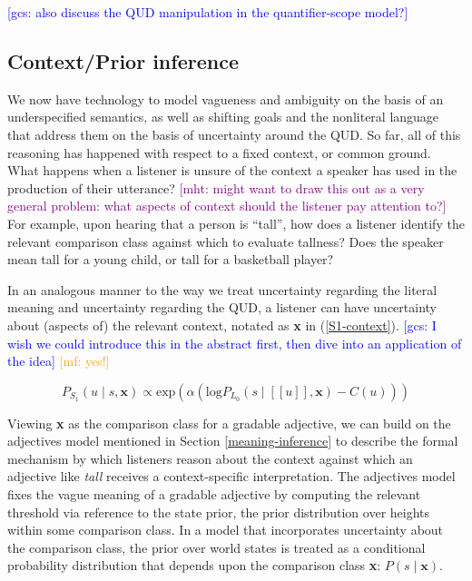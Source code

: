 \documentclass{sp}
\newcommand{\gcs}[1]{\textcolor{blue}{[gcs: #1]}}
\newcommand{\mf}[1]{\textcolor{orange}{[mf: #1]}}
\newcommand{\mht}[1]{\textcolor{purple}{[mht: #1]}}
\newcommand{\sem}[1]{\ensuremath{[\![#1]\!]}}
\begin{document}
\gcs{also discuss the QUD manipulation in the quantifier-scope model?}


\subsection{Context/Prior inference}

We now have technology to model vagueness and ambiguity on the basis of an underspecified semantics, as well as shifting goals and the nonliteral language that address them on the basis of uncertainty around the QUD. So far, all of this reasoning has happened with respect to a fixed context, or common ground. What happens when a listener is unsure of the context a speaker has used in the production of their utterance? \mht{might want to draw this out as a very general problem: what aspects of context should the listener pay attention to?} For example, upon hearing that a person is ``tall'', how does a listener identify the relevant comparison class against which to evaluate tallness? Does the speaker mean tall for a young child, or tall for a basketball player?

In an analogous manner to the way we treat uncertainty regarding the literal meaning and uncertainty regarding the QUD, a listener can have uncertainty about (aspects of) the relevant context, notated as \textbf{x} in (\ref{S1-context}). \gcs{I wish we could introduce this in the abstract first, then dive into an application of the idea} \mf{yes!}

\begin{equation} \label{S1-context}
P_{S_1}(u\mid s, \textbf{x}) \propto \textrm{exp}(\alpha (\textrm{log}P_{L_0}(s\mid \sem{u}, \textbf{x}) - C(u)))
\end{equation}

Viewing \textbf{x} as the comparison class for a gradable adjective, we can build on the \citeauthor{lassitergoodman2013} adjectives model mentioned in Section \ref{meaning-inference} to describe the formal mechanism by which listeners reason about the context against which an adjective like \emph{tall} receives a context-specific interpretation. The adjectives model fixes the vague meaning of a gradable adjective by computing the relevant threshold via reference to the state prior, the prior distribution over heights within some comparison class. In a model that incorporates uncertainty about the comparison class, the prior over world states is treated as a conditional probability distribution that depends upon the comparison class \textbf{x}: $P(s\mid \textbf{x})$.
\end{document}
